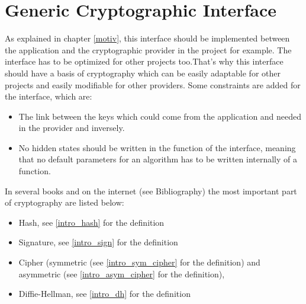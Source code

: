 ﻿\chapter{Generic Cryptographic Interface}
As explained in chapter \ref{motiv}, this interface should be implemented
between the application and the cryptographic provider in the project
\embtls for example. The interface has to be optimized for other projects
too.\newline That's why this interface should have a basis of cryptography which can
be easily adaptable for other projects and easily modifiable for other
providers.\newline
Some constraints are added for the interface, which are:
\begin{itemize}
  \item The link between the keys which could come from the application
  and needed in the provider and inversely.
  \item No hidden states should be written in the function of the interface,
  meaning that no default parameters for an algorithm has to be written
  internally of a function.\newline
\end{itemize}
In several books and on the internet (see Bibliography) the most
important part of cryptography are listed below:
\begin{itemize}
  \item Hash, see \ref{intro_hash} for the definition
  \item Signature, see \ref{intro_sign} for the definition
  \item Cipher (symmetric (see \ref{intro_sym_cipher} for the
  definition) and asymmetric (see \ref{intro_asym_cipher} for the definition), 
  \item Diffie-Hellman, see \ref{intro_dh} for the definition
\end{itemize}
\newpage

